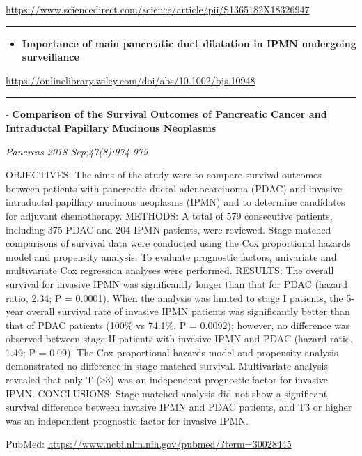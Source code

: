 \documentclass[]{article}
\providecommand{\tightlist}{%
  \setlength{\itemsep}{0pt}\setlength{\parskip}{0pt}}
\begin{document}
\url{https://www.sciencedirect.com/science/article/pii/S1365182X18326947}

\begin{center}\rule{0.5\linewidth}{\linethickness}\end{center}

\begin{itemize}
\tightlist
\item
  \textbf{Importance of main pancreatic duct dilatation in IPMN
  undergoing surveillance}
\end{itemize}

\url{https://onlinelibrary.wiley.com/doi/abs/10.1002/bjs.10948}

\begin{center}\rule{0.5\linewidth}{\linethickness}\end{center}

 - \textbf{Comparison of the Survival Outcomes of Pancreatic Cancer and
Intraductal Papillary Mucinous Neoplasms}

\emph{Pancreas 2018 Sep;47(8):974-979}

OBJECTIVES: The aims of the study were to compare survival outcomes
between patients with pancreatic ductal adenocarcinoma (PDAC) and
invasive intraductal papillary mucinous neoplasms (IPMN) and to
determine candidates for adjuvant chemotherapy. METHODS: A total of 579
consecutive patients, including 375 PDAC and 204 IPMN patients, were
reviewed. Stage-matched comparisons of survival data were conducted
using the Cox proportional hazards model and propensity analysis. To
evaluate prognostic factors, univariate and multivariate Cox regression
analyses were performed. RESULTS: The overall survival for invasive IPMN
was significantly longer than that for PDAC (hazard ratio, 2.34; P =
0.0001). When the analysis was limited to stage I patients, the 5-year
overall survival rate of invasive IPMN patients was significantly better
than that of PDAC patients (100\% vs 74.1\%, P = 0.0092); however, no
difference was observed between stage II patients with invasive IPMN and
PDAC (hazard ratio, 1.49; P = 0.09). The Cox proportional hazards model
and propensity analysis demonstrated no difference in stage-matched
survival. Multivariate analysis revealed that only T (≥3) was an
independent prognostic factor for invasive IPMN. CONCLUSIONS:
Stage-matched analysis did not show a significant survival difference
between invasive IPMN and PDAC patients, and T3 or higher was an
independent prognostic factor for invasive IPMN.

PubMed: \url{https://www.ncbi.nlm.nih.gov/pubmed/?term=30028445}
\end{document}
